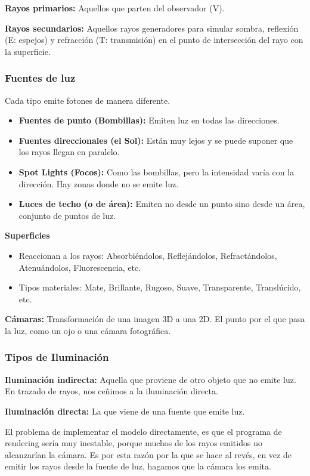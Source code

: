 \textbf{Rayos primarios:} Aquellos que parten del observador (V).

\textbf{Rayos secundarios:} Aquellos rayos generadores para simular sombra, reflexión (E: espejos) y refracción (T: transmisión) en el punto de intersección del rayo con la superficie.

\subsubsection{Fuentes de luz}
Cada tipo emite fotones de manera diferente.
\begin{itemize}
	\item \textbf{Fuentes de punto (Bombillas):} Emiten luz en todas las direcciones.
	\item \textbf{Fuentes direccionales (el Sol):} Están muy lejos y se puede suponer que los rayos llegan en paralelo.
	\item \textbf{Spot Lights (Focos):} Como las bombillas, pero la intensidad varía con la dirección. Hay zonas donde no se emite luz.
	\item \textbf{Luces de techo (o de área):} Emiten no desde un punto sino desde un área, conjunto de puntos de luz.
\end{itemize}
\pagebreak

\textbf{Superficies}
\begin{itemize}
	\item Reaccionan a los rayos: Absorbiéndolos, Reflejándolos, Refractándolos, Atenuándolos, Fluorescencia, etc.
	\item Tipos materiales: Mate, Brillante, Rugoso, Suave, Transparente, Translúcido, etc.
\end{itemize}

\textbf{Cámaras:} Transformación de una imagen 3D a una 2D. El punto por el que pasa la luz, como un ojo o una cámara fotográfica.

\subsubsection{Tipos de Iluminación}
\textbf{Iluminación indirecta:} Aquella que proviene de otro objeto que no emite luz. En trazado de rayos, nos ceñimos a la iluminación directa.

\textbf{Iluminación directa:} La que viene de una fuente que emite luz.

El problema de implementar el modelo directamente, es que el programa de rendering sería muy inestable, porque muchos de los rayos emitidos no alcanzarían la cámara. Es por esta razón por la que se hace al revés, en vez de emitir los rayos desde la fuente de luz, hagamos que la cámara los emita.

